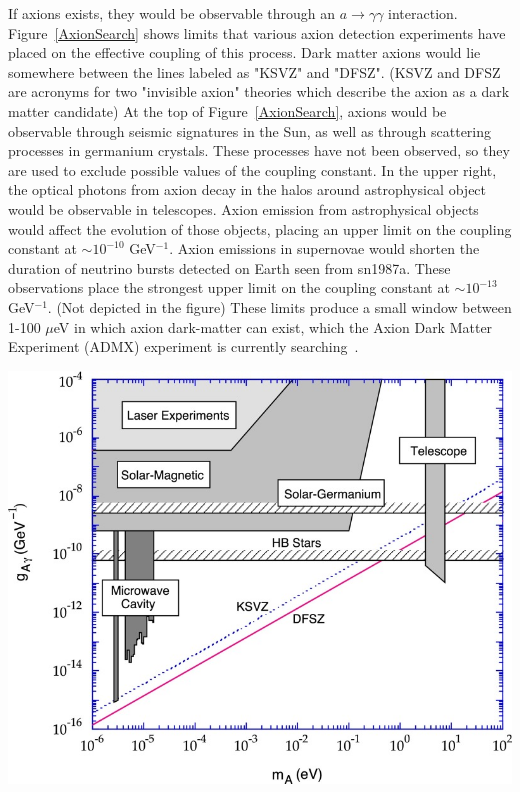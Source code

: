 If axions exists, they would be observable through an $a \rightarrow \gamma \gamma$ interaction.  Figure~\ref{AxionSearch} shows limits that various axion detection experiments have placed on the effective coupling of this process. Dark matter axions would lie somewhere between the lines labeled as "KSVZ" and "DFSZ". (KSVZ and DFSZ are acronyms for two "invisible axion" theories which describe the axion as a dark matter candidate) At the top of Figure~\ref{AxionSearch}, axions would be observable through seismic signatures in the Sun, as well as through scattering processes in germanium crystals.  These processes have not been observed, so they are used to exclude possible values of the coupling constant.  In the upper right, the optical photons from axion decay in the halos around astrophysical object would be observable in telescopes. Axion emission from astrophysical objects would affect the evolution of those objects, placing an upper limit on the coupling constant at $\sim 10^{-10}$ GeV$^{-1}$.  Axion emissions in supernovae would shorten the duration of neutrino bursts detected on Earth seen from sn1987a.  These observations place the strongest upper limit on the coupling constant at $\sim 10^{-13}$ GeV$^{-1}$. (Not depicted in the figure)  These limits produce a small window between 1-100 $\mu$eV in which axion dark-matter can exist, which the Axion Dark Matter Experiment (ADMX) experiment is currently searching~\cite{AxionReview}.

\begin{center}
\includegraphics[scale=3]{AxionSearch.jpg}
\label{AxionSearch}
\end{center}



